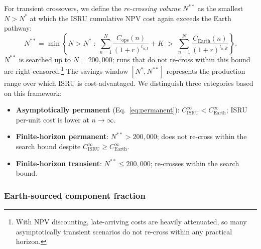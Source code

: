 \documentclass[preprint,12pt]{elsarticle}
\begin{document}
For transient crossovers, we define the \emph{re-crossing volume} $N^{**}$ as the smallest $N > N^*$ at which the ISRU cumulative NPV cost again exceeds the Earth pathway:
\begin{equation}
  N^{**} = \min\!\left\{N > N^* \;:\; \sum_{n=1}^{N} \frac{C_{\mathrm{ops}}(n)}{(1+r)^{t_{n,I}}} + K \;>\; \sum_{n=1}^{N} \frac{C_{\mathrm{Earth}}(n)}{(1+r)^{t_{n,E}}}\right\}.
  \label{eq:recrossing}
\end{equation}
$N^{**}$ is searched up to $N = 200{,}000$; runs that do not re-cross within this bound are right-censored.\footnote{With NPV discounting, late-arriving costs are heavily attenuated, so many asymptotically transient scenarios do not re-cross within any practical horizon.} The savings window $[N^*, N^{**}]$ represents the production range over which ISRU is cost-advantaged. We distinguish three categories based on this framework:
\begin{itemize}
\item \textbf{Asymptotically permanent} (Eq.~\ref{eq:permanent}): $C_{\mathrm{ISRU}}^{\infty} < C_{\mathrm{Earth}}^{\infty}$; ISRU per-unit cost is lower at $n \to \infty$.
\item \textbf{Finite-horizon permanent}: $N^{**} > 200{,}000$; does not re-cross within the search bound despite $C_{\mathrm{ISRU}}^{\infty} \geq C_{\mathrm{Earth}}^{\infty}$.
\item \textbf{Finite-horizon transient}: $N^{**} \leq 200{,}000$; re-crosses within the search bound.
\end{itemize}

\subsubsection{Earth-sourced component fraction}
\label{sec:vitamin}
\end{document}
